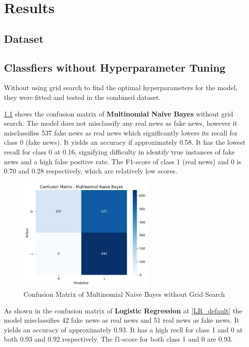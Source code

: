\chapter{Results}

\section{Dataset}

\section{Classfiers without Hyperparameter Tuning}
Without using grid search to find the optimal hyperparameters for the model, they were fitted and tested in the combined dataset.

\ref{MNB_default} shows the confusion matrix of \textbf{Multinomial Naive Bayes} without grid search. The model does not misclassify any real news as fake news, however it misclassifies 537 fake news as real news which significantly lowers its  recall for class 0 (fake news). It yields an accuracy if approximately 0.58. It has the lowest recall for class 0 at 0.16, signifying difficulty in identify true instances of fake news and a high false positive rate. The F1-score of class 1 (real news) and 0 is 0.70 and 0.28 respectively, which are relatively low scores.

\begin{figure}[h!]
    \centering
    \includegraphics[width=0.6\textwidth,height=0.6\textheight, keepaspectratio]{figures/hyperparam/MNB_default.png}
        \caption{Confusion Matrix of Multinomial Naive Bayes without Grid Search}
        \label{MNB_default}
\end{figure}

As shown in the confusion matrix of \textbf{Logistic Regression} at \ref{LR_default} the model misclassifies 42 fake news as real news and 51 real news as fake news. It yields an accuracy of approximately 0.93. It has a high recll for class 1 and 0 at both 0.93 and 0.92 respectively. The f1-score for both class 1 and 0 are 0.93.

